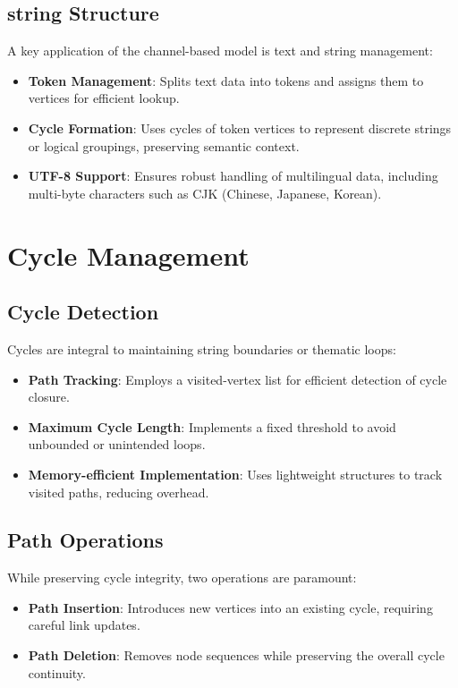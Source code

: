 \documentclass[12pt, a4paper]{article}
\begin{document}
\subsection{string Structure}
A key application of the channel-based model is text and string management:
\begin{itemize}
    \item \textbf{Token Management}: Splits text data into tokens and assigns them to vertices for efficient lookup.
    \item \textbf{Cycle Formation}: Uses cycles of token vertices to represent discrete strings or logical groupings, preserving semantic context.
    \item \textbf{UTF-8 Support}: Ensures robust handling of multilingual data, including multi-byte characters such as CJK (Chinese, Japanese, Korean).
\end{itemize}

\section{Cycle Management}\label{Sec:Cycles}
\subsection{Cycle Detection}
Cycles are integral to maintaining string boundaries or thematic loops:
\begin{itemize}
    \item \textbf{Path Tracking}: Employs a visited-vertex list for efficient detection of cycle closure.
    \item \textbf{Maximum Cycle Length}: Implements a fixed threshold to avoid unbounded or unintended loops.
    \item \textbf{Memory-efficient Implementation}: Uses lightweight structures to track visited paths, reducing overhead.
\end{itemize}

\subsection{Path Operations}
While preserving cycle integrity, two operations are paramount:
\begin{itemize}
    \item \textbf{Path Insertion}: Introduces new vertices into an existing cycle, requiring careful link updates.
    \item \textbf{Path Deletion}: Removes node sequences while preserving the overall cycle continuity.
\end{itemize}
\end{document}

